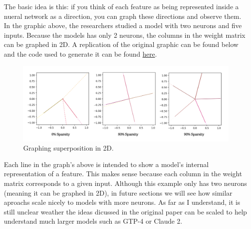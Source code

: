 \documentclass{article} %
\begin{document}
The basic idea is this: if you think of each feature as being represented inside a
nueral network as a direction, you can graph these directions and observe them.
In the graphic above, the researchers studied a model with two neurons and five inputs.
Because the models has only 2 neurons, the columns in the weight matrix can be graphed in 2D.
A replication of the original graphic can be found below and the code used to 
generate it can be found \href{https://github.com/zroe1/toy_models_of_superposition/blob/main/section_1/section_1.ipynb}{here}. 

\begin{figure}[h]
    \centering
    \includegraphics[width=0.68\linewidth]{section_1/images/section1_replicated_graphic.png}
    \captionsetup{font=footnotesize} %
    \caption{Graphing superposition in 2D.}
    \label{fig:section1_replication}
\end{figure}

Each line in the graph's above is intended to show a model's internal representation
of a feature. This makes sense because each column in the weight matrix
corresponds to a given input. Although this example only has two neurons (meaning 
it can be graphed in 2D), in future sections we will see how similar aproachs 
scale nicely to models with more neurons. As far as I understand, it is still 
unclear weather the ideas dicussed in the original paper can be scaled to help 
understand much larger models such as GTP-4 or Claude 2.
\end{document}
